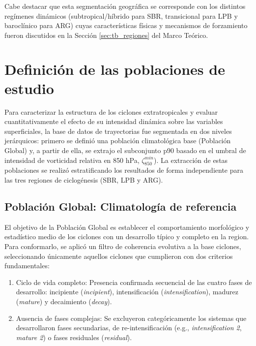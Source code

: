 Cabe destacar que esta segmentación geográfica se corresponde con los distintos regímenes dinámicos (subtropical/híbrido para SBR, transicional para LPB y baroclínico para ARG) cuyas características físicas y mecanismos de forzamiento fueron discutidos en la Sección \ref{sec:tb_regiones} del Marco Teórico.

\section{Definición de las poblaciones de estudio}\label{sec:poblaciones_estudio}

Para caracterizar la estructura de los ciclones extratropicales y evaluar cuantitativamente el efecto de su intensidad dinámica sobre las variables superficiales, la base de datos de trayectorias fue segmentada en dos niveles jerárquicos: primero se definió una población climatológica base (Población Global) y, a partir de ella, se extrajo el subconjunto p90 basado en el umbral de intensidad de vorticidad relativa en 850 hPa, $\zeta_{850}^{min}$). La extracción de estas poblaciones se realizó estratificando los resultados de forma independiente para las tres regiones de ciclogénesis (SBR, LPB y ARG).

\subsection{Población Global: Climatología de referencia}\label{subsec:grupo_global}

El objetivo de la Población Global es establecer el comportamiento morfológico y estadístico medio de los ciclones con un desarrollo típico y completo en la region. Para conformarlo, se aplicó un filtro de coherencia evolutiva a la base ciclones, seleccionando únicamente aquellos ciclones que cumplieron con dos criterios fundamentales:

\begin{enumerate}
    \item Ciclo de vida completo: Presencia confirmada secuencial de las cuatro fases de desarrollo: incipiente (\textit{incipient}), intensificación (\textit{intensification}), madurez (\textit{mature}) y decaimiento (\textit{decay}).
    \item Ausencia de fases complejas: Se excluyeron categóricamente los sistemas que desarrollaron fases secundarias, de re-intensificación (e.g., \textit{intensification 2}, \textit{mature 2}) o fases residuales (\textit{residual}).
\end{enumerate}


